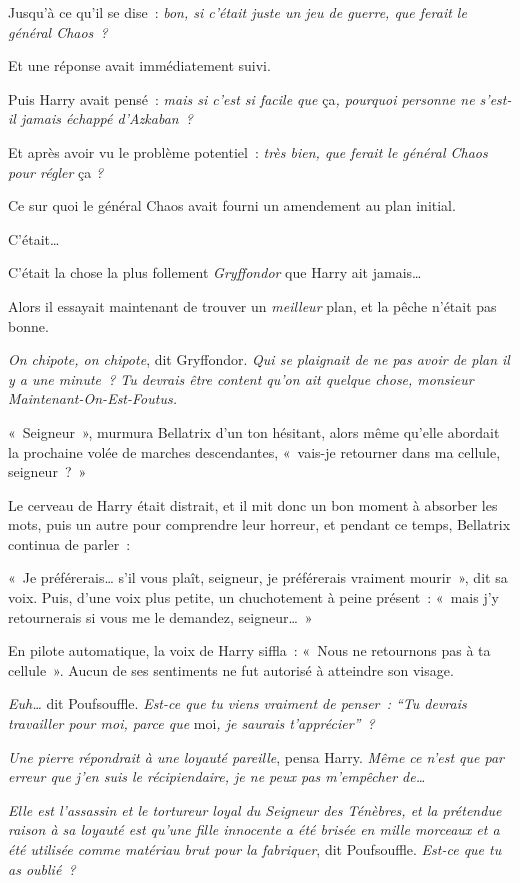 Jusqu'à ce qu'il se dise~: \emph{bon, si c'était juste un jeu de guerre, que ferait le général Chaos~?}

Et une réponse avait immédiatement suivi.

Puis Harry avait pensé~: \emph{mais si c'est si facile que} ça\emph{, pourquoi personne ne s'est-il jamais échappé d'Azkaban~?}

Et après avoir vu le problème potentiel~: \emph{très bien, que ferait le général Chaos pour régler} ça \emph{?}

Ce sur quoi le général Chaos avait fourni un amendement au plan initial.

C'était…

C'était la chose la plus follement \emph{Gryffondor} que Harry ait jamais…

Alors il essayait maintenant de trouver un \emph{meilleur} plan, et la pêche n'était pas bonne.

\emph{On chipote, on chipote}, dit Gryffondor. \emph{Qui se plaignait de ne pas avoir de plan il y a une minute~? Tu devrais être content qu'on ait quelque chose, monsieur Maintenant-On-Est-Foutus.}

«~Seigneur~», murmura Bellatrix d'un ton hésitant, alors même qu'elle abordait la prochaine volée de marches descendantes, «~vais-je retourner dans ma cellule, seigneur~?~»

Le cerveau de Harry était distrait, et il mit donc un bon moment à absorber les mots, puis un autre pour comprendre leur horreur, et pendant ce temps, Bellatrix continua de parler~:

«~Je préférerais… s'il vous plaît, seigneur, je préférerais vraiment mourir~», dit sa voix. Puis, d'une voix plus petite, un chuchotement à peine présent~: «~mais j'y retournerais si vous me le demandez, seigneur…~»

En pilote automatique, la voix de Harry siffla~: «~Nous ne retournons pas à ta cellule~». Aucun de ses sentiments ne fut autorisé à atteindre son visage.

\emph{Euh…} dit Poufsouffle. \emph{Est-ce que tu viens vraiment de penser~: “Tu devrais travailler pour moi, parce que} moi\emph{, je saurais t'apprécier”~?}

\emph{Une pierre répondrait à une loyauté pareille}, pensa Harry. \emph{Même ce n'est que par erreur que j'en suis le récipiendaire, je ne peux pas m'empêcher de…}

\emph{Elle est l'assassin et le tortureur loyal du Seigneur des Ténèbres, et la prétendue raison à sa loyauté est qu'une fille innocente a été brisée en mille morceaux et a été utilisée comme matériau brut pour la fabriquer}, dit Poufsouffle. \emph{Est-ce que tu as oublié~?}

